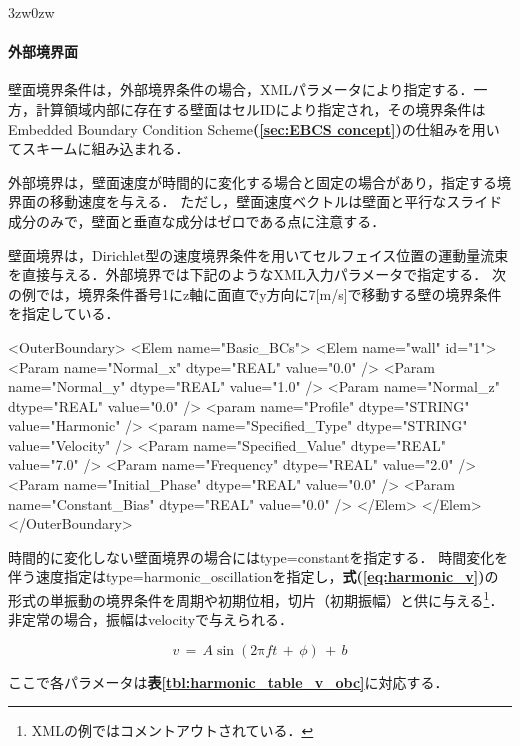 \begin{indentation}{3zw}{0zw}
\paragraph{外部境界面}
壁面境界条件は，外部境界条件の場合，XMLパラメータにより指定する．一方，計算領域内部に存在する壁面はセルIDにより指定され，その境界条件はEmbedded Boundary Condition Scheme\textbf{(\ref{sec:EBCS concept})}の仕組みを用いてスキームに組み込まれる．

外部境界は，壁面速度が時間的に変化する場合と固定の場合があり，指定する境界面の移動速度を与える．
ただし，壁面速度ベクトルは壁面と平行なスライド成分のみで，壁面と垂直な成分はゼロである点に注意する．

壁面境界は，Dirichlet型の速度境界条件を用いてセルフェイス位置の運動量流束を直接与える．外部境界では下記のようなXML入力パラメータで指定する．
次の例では，境界条件番号1にz軸に面直でy方向に7[m/s]で移動する壁の境界条件を指定している．

{\small
\begin{program}
<OuterBoundary>
  <Elem name="Basic_BCs">
    <Elem name="wall" id="1">
      <Param name="Normal_x"        dtype="REAL"   value="0.0" />
      <Param name="Normal_y"        dtype="REAL"   value="1.0" />
      <Param name="Normal_z"        dtype="REAL"   value="0.0" />
      <param name="Profile"         dtype="STRING" value="Harmonic" />
      <param name="Specified_Type"  dtype="STRING" value="Velocity" />
      <Param name="Specified_Value" dtype="REAL"   value="7.0" />
      <Param name="Frequency"       dtype="REAL"   value="2.0" />
      <Param name="Initial_Phase"   dtype="REAL"   value="0.0" />
      <Param name="Constant_Bias"   dtype="REAL"   value="0.0" />
    </Elem>
  </Elem>
</OuterBoundary>
\end{program}
}

\noindent 時間的に変化しない壁面境界の場合にはtype=constantを指定する．
時間変化を伴う速度指定はtype=harmonic\_oscillationを指定し，\textbf{式(\ref{eq:harmonic_v})}の形式の単振動の境界条件を周期や初期位相，切片（初期振幅）と供に与える\footnote{XMLの例ではコメントアウトされている．}．非定常の場合，振幅はvelocityで与えられる．

\begin{equation}
v \,{=}\, A \sin \left( 2 \mathrm{\pi} ft \,+\, \phi \right) \,+\, b
\label{eq:harmonic_v}
\end{equation}

ここで各パラメータは\textbf{表\ref{tbl:harmonic_table_v_obc}}に対応する．


\end{indentation}
